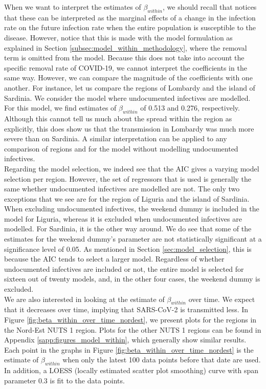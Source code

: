 \documentclass[12pt]{article}
\begin{document}
    When we want to interpret the estimates of $\beta_{within}$, we should recall that \textcite{adda2016economic} notices that these can be interpreted as the marginal effects of a change in the infection rate on the future infection rate when the entire population is susceptible to the disease. However, notice that this is made with the model formulation as explained in Section \ref{subsec:model_within_methodology}, where the removal term is omitted from the model. Because this does not take into account the specific removal rate of COVID-19, we cannot interpret the coefficients in the same way. However, we can compare the magnitude of the coefficients with one another. For instance, let us compare the regions of Lombardy and the island of Sardinia. We consider the model where undocumented infectives are modelled. For this model, we find estimates of $\beta_{within}$ of 0.513 and 0.276, respectively. Although this cannot tell us much about the spread within the region as explicitly, this does show us that the transmission in Lombardy was much more severe than on Sardinia. A similar interpretation can be applied to any comparison of regions and for the model without modelling undocumented infectives. \\

    Regarding the model selection, we indeed see that the AIC gives a varying model selection per region. However, the set of regressors that is used is generally the same whether undocumented infectives are modelled are not. The only two exceptions that we see are for the region of Liguria and the island of Sardinia. When excluding undocumented infectives, the weekend dummy is included in the model for Liguria, whereas it is excluded when undocumented infectives are modelled. For Sardinia, it is the other way around. We do see that some of the estimates for the weekend dummy's parameter are not statistically significant at a significance level of 0.05. As mentioned in Section \ref{sec:model_selection}, this is because the AIC tends to select a larger model. Regardless of whether undocumented infectives are included or not, the entire model is selected for sixteen out of twenty models, and, in the other four cases, the weekend dummy is excluded. \\
	
	We are also interested in looking at the estimate of $\beta_{within}$ over time. We expect that it decreases over time, implying that SARS-CoV-2 is transmitted less. In Figure \ref{fig:beta_within_over_time_nordest}, we present plots for the regions in the Nord-Est NUTS 1 region. Plots for the other NUTS 1 regions can be found in Appendix \ref{sapp:figures_model_within}, which generally show similar results. Each point in the graphs in Figure \ref{fig:beta_within_over_time_nordest} is the estimate of $\beta_{within}$ when only the latest 100 data points before that date are used. In addition, a LOESS (locally estimated scatter plot smoothing) curve with span parameter 0.3 is fit to the data points. \\
	
\end{document}
